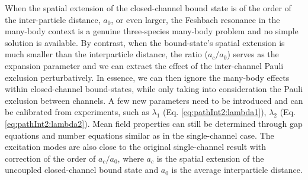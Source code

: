 When the spatial extension of  the closed-channel bound state is  of the order of the   inter-particle distance, $a_{0}$, or even larger, the Feshbach resonance in the many-body context is a genuine three-species many-body problem and no simple solution is available.  By contrast, when the bound-state's spatial extension is much smaller than the interparticle distance, the ratio ($a_{c}/a_{0}$) serves as the expansion parameter and we can extract  the effect of the inter-channel Pauli exclusion perturbatively.  In essence, we can then  ignore the many-body effects within  closed-channel bound-states, while only taking into consideration  the Pauli exclusion between channels.  A few new parameters need to be introduced and can be calibrated from experiments, such as $\lambda_{1}$ (Eq. \ref{eq:pathInt2:lambda1}), $\lambda_{2}$ (Eq. \ref{eq:pathInt2:lambda2}).  Mean field properties can still be determined through gap equations and number equations similar as in the single-channel case.  The excitation modes are also close to the original single-channel result with correction of the order of $a_{c}/a_{0}$, where $a_{c}$ is the spatial extension of the uncoupled closed-channel  bound state and $a_{0}$ is the average interparticle distance.

